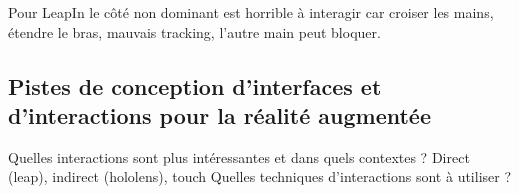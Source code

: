 Pour LeapIn le côté non dominant est horrible à interagir car croiser les mains, étendre le bras, mauvais tracking, l'autre main peut bloquer.

\subsection{Pistes de conception d'interfaces et d'interactions pour la réalité augmentée}
Quelles interactions sont plus intéressantes et dans quels contextes ? Direct (leap), indirect (hololens), touch
Quelles techniques d'interactions sont à utiliser ?